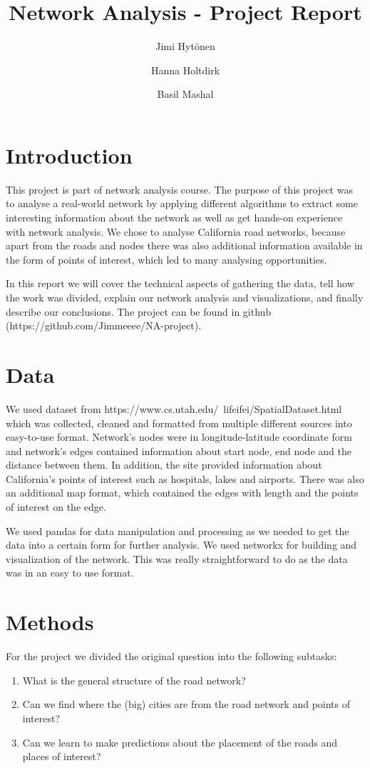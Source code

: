 \documentclass[11pt]{article}
\title{Network Analysis - Project Report}
\author{
    Jimi Hytönen\\
    \and Hanna Holtdirk\\
    \and Basil Mashal
}
\begin{document}
\maketitle

\section{Introduction}
This project is part of network analysis course. The purpose of this project was to analyse a real-world network by applying different algorithms to extract some interesting information about the network as well as get hands-on experience with network analysis. We chose to analyse California road networks, because apart from the roads and nodes there was also additional information available in the form of points of interest, which led to many analysing opportunities.


In this report we will cover the technical aspects of gathering the data, tell how the work was divided, explain our network analysis and visualizations, and finally describe our conclusions. The project can be found in github (https://github.com/Jimmeeee/NA-project).



\section{Data}

We used dataset from https://www.cs.utah.edu/~lifeifei/SpatialDataset.html which was collected, cleaned and formatted from multiple different sources into easy-to-use format. Network's nodes were in longitude-latitude coordinate form and network's edges contained information about start node, end node and the distance between them. In addition, the site provided information about California's points of interest such as hospitals, lakes and airports. There was also an additional map format, which contained the edges with length and the points of interest on the edge. 

We used pandas for data manipulation and processing as we needed to get the data into a certain form for further analysis. We used networkx for building and visualization of the network. This was really straightforward to do as the data was in an easy to use format.  

\newpage

\section{Methods}
For the project we divided the original question into the following subtasks: 
\begin{enumerate}
\item What is the general structure of the road network?
\item Can we find where the (big) cities are from the road network and points of interest?
\item Can we learn to make predictions about the placement of the roads and places of interest?
\end{enumerate}
\end{document}
